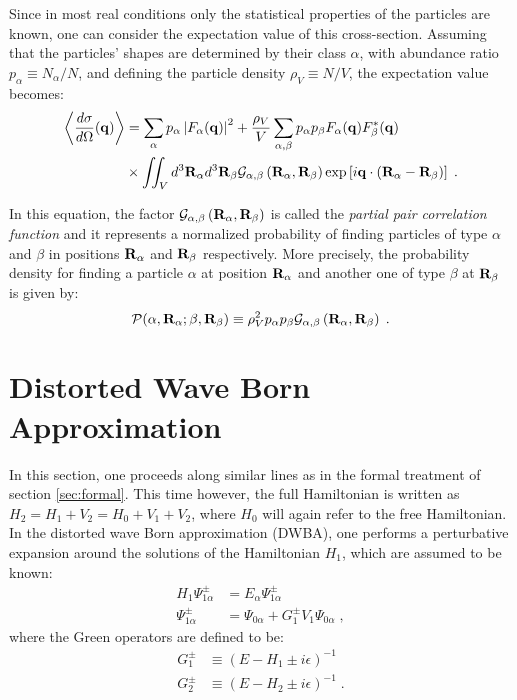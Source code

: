 Since in most real conditions only the statistical properties of the particles are known, one can consider the expectation value of this cross-section. Assuming that the particles' shapes are determined by their class $\alpha$, with abundance ratio $p_\alpha \equiv N_\alpha / N$, and defining the particle density $\rho_V \equiv N/V$, the expectation value becomes:
\begin{align*}
  \left\langle \frac{d\sigma}{d\Omega}(\mathbf{q}) \right\rangle  & = \sum_\alpha p_\alpha \left\lvert F_\alpha(\mathbf{q})\right\rvert ^2 + \frac{\rho_V}{V}\sum_{\alpha,\beta} p_\alpha p_\beta F_\alpha (\mathbf{q})F_\beta^*(\mathbf{q})  \\
  & \times \iint_V d^3\mathbf{R}_\alpha d^3\mathbf{R}_\beta \mathcal{G}_{\alpha ,\beta}\left( \mathbf{R}_{\alpha} , \mathbf{R}_{\beta} \right) \exp \left[ i\mathbf{q}\cdot (\mathbf{R}_\alpha - \mathbf{R}_\beta ) \right] \; .
\end{align*}

In this equation, the factor $\mathcal{G}_{\alpha ,\beta}\left( \mathbf{R}_{\alpha} , \mathbf{R}_{\beta} \right)$ is called the \emph{partial pair correlation function} and it represents a normalized probability of finding particles of type $\alpha$ and $\beta$ in positions $\mathbf{R}_\alpha$ and $\mathbf{R}_\beta$ respectively. More precisely, the probability density for finding a particle $\alpha$ at position $\mathbf{R}_\alpha$ and another one of type $\beta$ at $\mathbf{R}_\beta$ is given by:
\begin{equation*}
  \mathcal{P}(\alpha, \mathbf{R}_\alpha ; \beta , \mathbf{R}_\beta ) \equiv \rho_V^2 p_\alpha p_\beta \mathcal{G}_{\alpha ,\beta}\left( \mathbf{R}_{\alpha} , \mathbf{R}_{\beta} \right) \; .
\end{equation*}


\section{Distorted Wave Born Approximation} 

In this section, one proceeds along similar lines as in the formal treatment of section \ref{sec:formal}. This time however, the full Hamiltonian is written as $H_2 = H_1 + V_2 = H_0 +V_1 + V_2$, where $H_0$ will again refer to the free Hamiltonian. In the distorted wave Born approximation (DWBA), one performs a perturbative expansion around the solutions of the Hamiltonian $H_1$, which are assumed to be known:
\begin{align*}
  H_1\Psi^\pm_{1\alpha} &= E_\alpha\Psi^\pm_{1\alpha} \\
  \Psi^\pm_{1\alpha} &= \Psi_{0\alpha} + G^\pm_1 V_1 \Psi_{0\alpha} \; ,
\end{align*}
where the Green operators are defined to be:
\begin{align*}
  G^\pm_1 &\equiv (E-H_1\pm i\epsilon) ^{-1} \nonumber \\
  G^\pm_2 &\equiv (E-H_2\pm i\epsilon) ^{-1} \; .
\end{align*}

